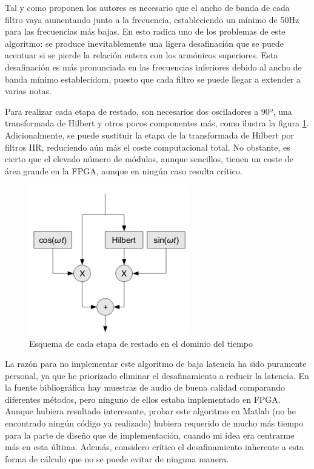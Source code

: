 Tal y como proponen los autores es necesario que el ancho de banda de cada filtro vaya aumentando junto a la frecuencia, estableciendo un mínimo de 50Hz para las frecuencias más bajas. En esto radica uno de los problemas de este algoritmo: se produce inevitablemente una ligera desafinación que se puede acentuar si se pierde la relación entera con los armónicos superiores. Esta desafinación es más pronunciada en las frecuencias inferiores debido al ancho de banda mínimo establecidom, puesto que cada filtro se puede llegar a extender a varias notas.

Para realizar cada etapa de restado, son necesarios dos osciladores a 90º, una transformada de Hilbert y otros pocos componentes más, como ilustra la figura \ref{fig:restahil}. Adicionalmente, se puede sustituir la etapa de la transformada de Hilbert por filtros IIR, reduciendo aún más el coste computacional total. No obstante, es cierto que el elevado número de módulos, aunque sencillos, tienen un coste de área grande en la FPGA, aunque en ningún caso resulta crítico.

\begin{figure}[!t]
\begin{center}
\includegraphics[width=7cm]{img/fs_hilbert.png}
\caption{\label{fig:restahil}Esquema de cada etapa de restado en el dominio del tiempo}
\end{center}
\end{figure}

La razón para no implementar este algoritmo de baja latencia ha sido puramente personal, ya que he priorizado eliminar el desafinamiento a reducir la latencia. En la fuente bibliográfica \cite{hilbert} hay muestras de audio de buena calidad comparando diferentes métodos, pero ninguno de ellos estaba implementado en FPGA. Aunque hubiera resultado interesante, probar este algoritmo en Matlab (no he encontrado ningún código ya realizado) hubiera requerido de mucho más tiempo para la parte de diseño que de implementación, cuando mi idea era centrarme más en esta última. Además, considero crítico el desafinamiento inherente a esta forma de cálculo que no se puede evitar de ninguna manera.

